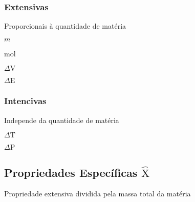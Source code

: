\documentclass{article}
\begin{document}
\begin{multicols}{2}

\noindent%
\begin{minipage}{\linewidth}

\subsubsection*{Extensivas}
%
Proporcionais à quantidade de matéria
%

\vspace{5mm}

\begin{tcolorbox}
\begin{itemize}
\begin{multicols}{2}
\item $m$
\item \unit{\mole}
\item $\Delta\mathrm{V}$
\item $\Delta\mathrm{E}$
\end{multicols}
\end{itemize}
\end{tcolorbox}

\end{minipage}

\vspace{5mm}

\noindent%
\begin{minipage}{\linewidth}

\subsubsection*{Intencivas}
%
Independe da quantidade de matéria
%

\vspace{5mm}

\begin{tcolorbox}
\begin{itemize}
\begin{multicols}{2}
\item $\Delta\mathrm{T}$
\item $\Delta\mathrm{P}$
\end{multicols}
\end{itemize}
\end{tcolorbox}\relax

\end{minipage}

\subsection{Propriedades Específicas $\widehat{\mathrm{X}}$}
\label{ - Propriedades Específicas}
%
Propriedade extensiva dividida pela massa total da matéria
%


\end{multicols}
\end{document}
